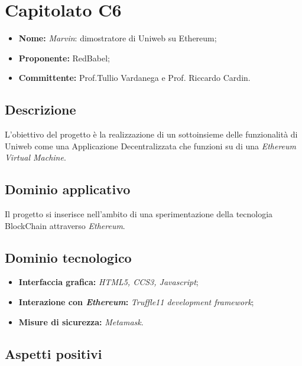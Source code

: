 \documentclass[openany,12pt,a4paper]{report}
\begin{document}

	\section{Capitolato C6}

	\begin{itemize}
		\item \textbf{Nome:} \textit{Marvin}: dimostratore di Uniweb su Ethereum;
		\item \textbf{Proponente:} RedBabel;
		\item \textbf{Committente:} Prof.Tullio Vardanega e Prof. Riccardo Cardin.
	\end{itemize}

	\subsection{Descrizione}

	L'obiettivo del progetto è la realizzazione di un sottoinsieme delle funzionalità di Uniweb come una Applicazione Decentralizzata che funzioni su di una \textit{Ethereum Virtual Machine}.

	\subsection{Dominio applicativo}

	Il progetto si inserisce nell'ambito di una sperimentazione della tecnologia BlockChain attraverso \textit{Ethereum}.

	\subsection{Dominio tecnologico}

	\begin{itemize}
		\item \textbf{Interfaccia grafica:} \textit{HTML5, CCS3, Javascript};

		\item \textbf{Interazione con \textit{Ethereum}:} \textit{Truffle11 development framework};

		\item \textbf{Misure di sicurezza:} \textit{Metamask}.
	\end{itemize}

	\subsection{Aspetti positivi}
\end{document}
